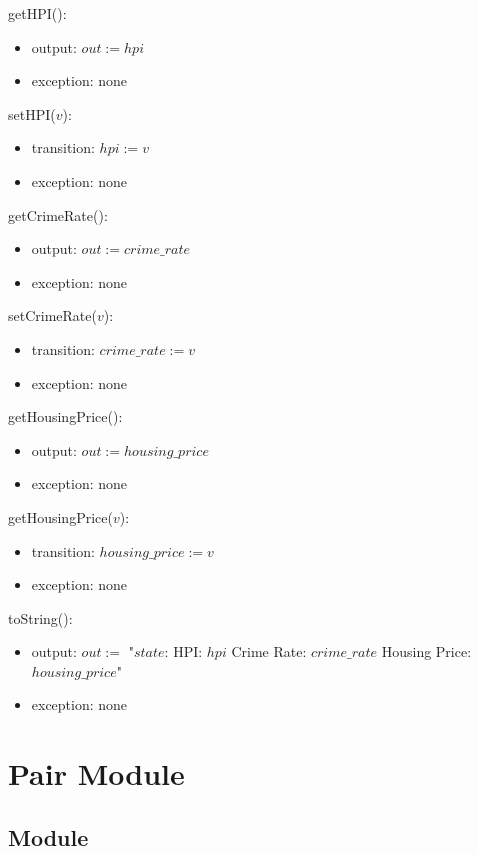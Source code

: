 \documentclass[12pt]{article}
\begin{document}
\noindent getHPI():
\begin{itemize}
\item output: $out := hpi$
\item exception: none
\end{itemize}

\noindent setHPI($v$):
\begin{itemize}
\item transition: $hpi := v$
\item exception: none
\end{itemize}

\noindent getCrimeRate():
\begin{itemize}
\item output: $out := crime\_rate$
\item exception: none
\end{itemize}

\noindent setCrimeRate($v$):
\begin{itemize}
\item transition: $crime\_rate := v$
\item exception: none
\end{itemize}

\noindent getHousingPrice():
\begin{itemize}
\item output: $out := housing\_price$
\item exception: none
\end{itemize}

\noindent getHousingPrice($v$):
\begin{itemize}
\item transition: $housing\_price := v$
\item exception: none
\end{itemize}

\noindent toString():
\begin{itemize}
\item output: $\mathit{out} :=$ "$state$: HPI: $hpi$ Crime Rate: $crime\_rate$ Housing Price: $housing\_price$"
\item exception: none
\end{itemize}


\newpage

\newpage

\section* {Pair Module}

\subsection*{Module}
\end{document}
